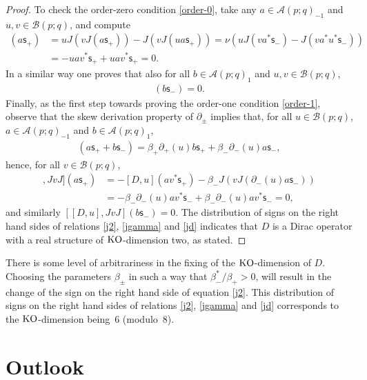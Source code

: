 \documentclass[10pt,a4paper]{amsart}
\numberwithin{equation}{section}
\def\Weyl#1#2{{\mathcal{B}}(#1;#2)}
\def\AWeyl#1#2{{\mathcal{A}}(#1;#2)}
\begin{document}
\begin{proof}
To check the order-zero condition \eqref{order-0}, take any $a\in \AWeyl p q_{-1}$ and $u,v\in \Weyl p q$, and compute
\begin{align*}
[u, J vJ](a {\mathsf{s}}_+) &= uJ ( vJ (a {\mathsf{s}}_+ ) ) - J ( vJ (ua {\mathsf{s}}_+ ) )
 = \nu (u J (v a^*{\mathsf{s}}_- ) - J (v a^*u^*{\mathsf{s}}_- ) )\\
&= -uav^*{\mathsf{s}}_+ +uav^*{\mathsf{s}}_+ =0.
\end{align*}
In a similar way one proves that also for all $b\in \AWeyl p q_{1}$ and $u,v\in \Weyl p q$,
\begin{gather*}
[u, J vJ](b {\mathsf{s}}_-)=0.
\end{gather*}
 Finally, as the f\/irst step towards proving the order-one condition \eqref{order-1}, observe that the skew derivation property of $\partial_\pm$ implies that, for all $u\in \Weyl p q$, $a\in \AWeyl p q_{-1}$ and $b\in \AWeyl p q_{1}$,
\begin{gather*}
[D,u](a {\mathsf{s}}_++b {\mathsf{s}}_-) = \beta_+\partial_+(u)b {\mathsf{s}}_++\beta_-\partial_-(u)a {\mathsf{s}}_-,
\end{gather*}
hence, for all $v\in \Weyl p q$,
\begin{align*}
[[D,u], J vJ] (a {\mathsf{s}}_+) &= - [D,u](av^*{\mathsf{s}}_+) - \beta_- J(vJ(\partial_-(u)a {\mathsf{s}}_-))\\
&= -\beta_-\partial_-(u)av^*{\mathsf{s}}_- +\beta_-\partial_-(u)av^*{\mathsf{s}}_- =0,
\end{align*}
and similarly $[[D,u], J vJ] (b {\mathsf{s}}_-) =0$. The distribution of signs on the right hand sides of relations \eqref{j2}, \eqref{jgamma} and \eqref{jd} indicates that $D$ is a Dirac operator with a real structure of ${\rm KO}$-dimension two, as stated.
\end{proof}

\begin{Remark}
There is some level of arbitrariness in the f\/ixing of the ${\rm KO}$-dimension of $D$. Choosing the parameters $\beta_\pm$ in such a way that $\beta_-^*/\beta_+>0$, will result in the change of the sign on the right hand side of equation \eqref{j2}. This distribution of signs on the right hand sides of relations \eqref{j2}, \eqref{jgamma} and \eqref{jd} corresponds to the ${\rm KO}$-dimension being~6 (modulo~8).
\end{Remark}

\section{Outlook}
\end{document}
